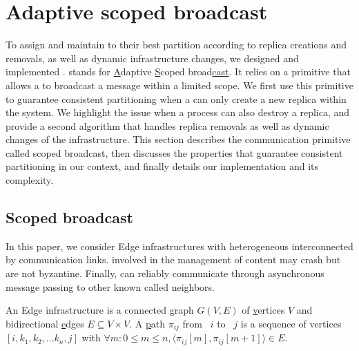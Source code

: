 
\section{Adaptive scoped broadcast}
\label{sec:adaptive}

To assign and maintain \processes to their best partition according to
replica creations and removals, as well as dynamic infrastructure
changes, we designed and implemented \NAME.  \NAME stands for
\underline{A}daptive \underline{S}coped broad\underline{cast}. It
relies on a primitive that allows a \process to broadcast a message
within a limited scope. We first use this primitive to guarantee
consistent partitioning when a \process can only create a new replica
within the system. We highlight the issue when a process can also
destroy a replica, and provide a second algorithm that handles replica
removals as well as dynamic changes of the infrastructure.  This
section describes the communication primitive called scoped broadcast,
then discusses the properties that guarantee consistent partitioning
in our context, and finally details our implementation \NAME and its
complexity.


\subsection{Scoped broadcast}
\label{subsec:scoped}

%

In this paper, we consider Edge infrastructures with heterogeneous
\nodes interconnected by communication links. \Processes involved in
the management of content may crash but are not byzantine.  Finally,
\processes can reliably communicate through asynchronous message
passing to other known \processes called neighbors.  %

\begin{definition}
  An Edge infrastructure is a connected \underline{g}raph $G(V, E)$ of
  \underline{v}ertices $V$ and bidirectional \underline{e}dges $E
  \subseteq V \times V$.  A \underline{p}ath $\pi_{ij}$ from
  \Process~$i$ to \Process~$j$ is a sequence of vertices $[i, k_1,
    k_2, \ldots k_n, j]$ with $\forall m: 0\leq m \leq n, \langle
  \pi_{ij}[m], \pi_{ij}[m+1] \rangle \in E$.
\end{definition}


